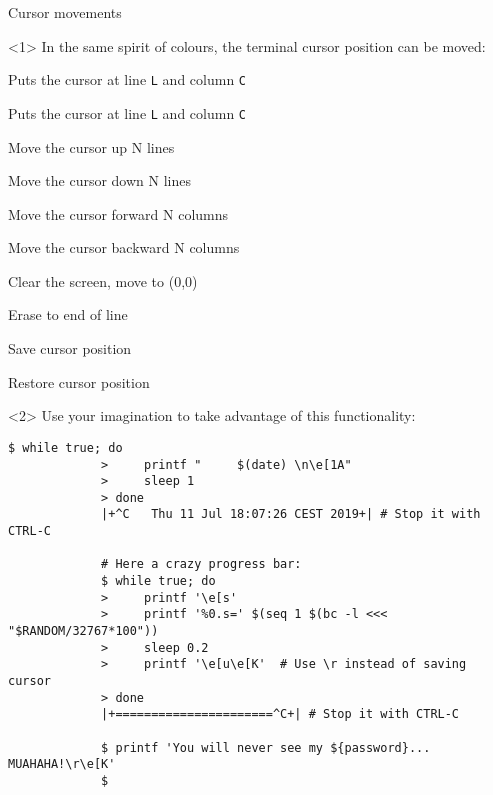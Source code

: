 \begin{frame}[fragile]{Cursor movements}
    \vspace{-1mm}
    \begin{onlyenv}<1>
        In the same spirit of colours, the terminal cursor position can be moved:
        \smallskip
        \begin{description}
            {\item[\texttt{<Esc>[<L>;<C>H}] Puts the cursor at line \texttt{L} and column \texttt{C}
            \item[\texttt{<Esc>[<L>;<C>f}] Puts the cursor at line \texttt{L} and column \texttt{C}
            \item[\texttt{<Esc>[<N>A}] Move the cursor up N lines
            \item[\texttt{<Esc>[<N>B}] Move the cursor down N lines
            \item[\texttt{<Esc>[<N>C}] Move the cursor forward N columns
            \item[\texttt{<Esc>[<N>D}] Move the cursor backward N columns
            \item[\texttt{<Esc>[2J}] Clear the screen, move to (0,0)
            \item[\texttt{<Esc>[K}] Erase to end of line
            \item[\texttt{<Esc>[s}] Save cursor position
            \item[\texttt{<Esc>[u}] Restore cursor position}
        \end{description}
    \end{onlyenv}
    \begin{onlyenv}<2>
        Use your imagination to take advantage of this functionality:
        \medskip
        \begin{lstlisting}[style=MyBash, numbers=none, xleftmargin=3mm, xrightmargin=3mm]
             $ while true; do
             >     printf "     $(date) \n\e[1A"
             >     sleep 1
             > done
             |+^C   Thu 11 Jul 18:07:26 CEST 2019+| # Stop it with CTRL-C
             
             # Here a crazy progress bar:
             $ while true; do
             >     printf '\e[s'
             >     printf '%0.s=' $(seq 1 $(bc -l <<< "$RANDOM/32767*100"))
             >     sleep 0.2
             >     printf '\e[u\e[K'  # Use \r instead of saving cursor
             > done
             |+======================^C+| # Stop it with CTRL-C
             
             $ printf 'You will never see my ${password}... MUAHAHA!\r\e[K'
             $
        \end{lstlisting}
    \end{onlyenv}
\end{frame}

